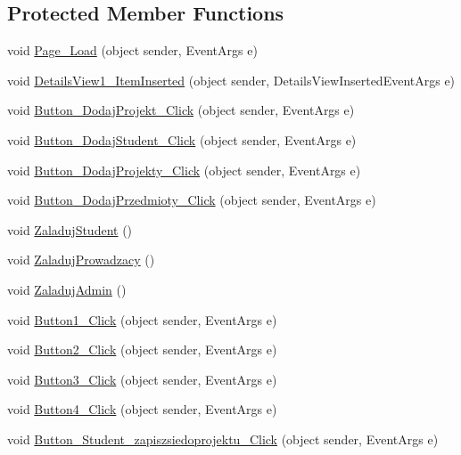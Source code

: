 \subsection*{Protected Member Functions}
\begin{DoxyCompactItemize}
\item 
void \hyperlink{class_dziennik_ocen_web2_1_1_web_form1_ab279bd28af40dbba4b6c933af6666b27}{Page\+\_\+\+Load} (object sender, Event\+Args e)
\item 
void \hyperlink{class_dziennik_ocen_web2_1_1_web_form1_a51ab823b90323b205965fe55382e67e8}{Details\+View1\+\_\+\+Item\+Inserted} (object sender, Details\+View\+Inserted\+Event\+Args e)
\item 
void \hyperlink{class_dziennik_ocen_web2_1_1_web_form1_a231125238692401bbf89113d844e9e4b}{Button\+\_\+\+Dodaj\+Projekt\+\_\+\+Click} (object sender, Event\+Args e)
\item 
void \hyperlink{class_dziennik_ocen_web2_1_1_web_form1_a744c3c80bc4d8258797f13a886cd6087}{Button\+\_\+\+Dodaj\+Student\+\_\+\+Click} (object sender, Event\+Args e)
\item 
void \hyperlink{class_dziennik_ocen_web2_1_1_web_form1_aed94ee8575b41f7814a7955246d6ead4}{Button\+\_\+\+Dodaj\+Projekty\+\_\+\+Click} (object sender, Event\+Args e)
\item 
void \hyperlink{class_dziennik_ocen_web2_1_1_web_form1_a91c8516e0424804b520f798d112c6feb}{Button\+\_\+\+Dodaj\+Przedmioty\+\_\+\+Click} (object sender, Event\+Args e)
\item 
void \hyperlink{class_dziennik_ocen_web2_1_1_web_form1_a34bbbefe0677191a7a1927bbdfb52221}{Zaladuj\+Student} ()
\item 
void \hyperlink{class_dziennik_ocen_web2_1_1_web_form1_a1de7a96a7f82aeb38649a30c9fc9bb30}{Zaladuj\+Prowadzacy} ()
\item 
void \hyperlink{class_dziennik_ocen_web2_1_1_web_form1_a23f4a376efd1a0414fecdabc4457072b}{Zaladuj\+Admin} ()
\item 
void \hyperlink{class_dziennik_ocen_web2_1_1_web_form1_a42c9efde3f2521e876ec3e9ab6217b4f}{Button1\+\_\+\+Click} (object sender, Event\+Args e)
\item 
void \hyperlink{class_dziennik_ocen_web2_1_1_web_form1_aa743385735daea1ff89ee7942693aaec}{Button2\+\_\+\+Click} (object sender, Event\+Args e)
\item 
void \hyperlink{class_dziennik_ocen_web2_1_1_web_form1_aefb1ce8922cf82b4eb7e5e42e59b3f7d}{Button3\+\_\+\+Click} (object sender, Event\+Args e)
\item 
void \hyperlink{class_dziennik_ocen_web2_1_1_web_form1_a8b588699eca20966d75ba7e454ef01eb}{Button4\+\_\+\+Click} (object sender, Event\+Args e)
\item 
void \hyperlink{class_dziennik_ocen_web2_1_1_web_form1_a479205a9a82393a787866873176ab319}{Button\+\_\+\+Student\+\_\+zapiszsiedoprojektu\+\_\+\+Click} (object sender, Event\+Args e)
\end{DoxyCompactItemize}
